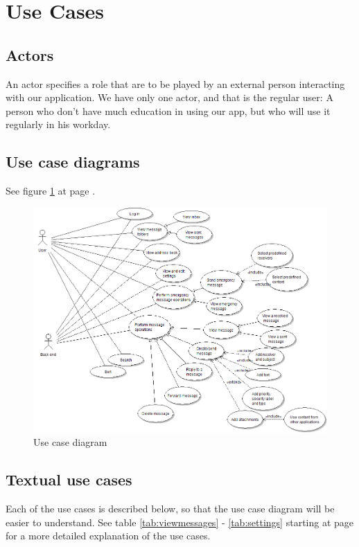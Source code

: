 \section{Use Cases}

\subsection{Actors}
An actor specifies a role that are to be played by an external person interacting with our application. We have only one actor, and that is the regular user:  A person who don’t have much education in using our app, but who will use it regularly in his workday.

\subsection{Use case diagrams}
See figure \ref{fig:usecase} at page \pageref{fig:usecase}.

\begin{figure}
\begin{center}
\includegraphics[width=\textwidth]{kpro-use-case}
\caption{Use case diagram} \label{fig:usecase}
\end{center}
\end{figure}

\subsection{Textual use cases}
Each of the use cases is described below, so that the use case diagram will be easier to understand. See table \ref{tab:viewmessages} - \ref{tab:settings} starting at page \pageref{tab:viewmessages} for a more detailed explanation of the use cases.

